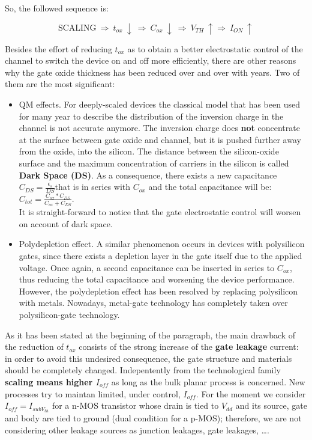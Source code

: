 \documentclass[a4paper, 12pt, twoside, openright]{report}
\begin{document}
So, the followed sequence is:

\begin{equation}
\text{SCALING} \ \Rightarrow \ t_{ox} \ \downarrow \ \Rightarrow \ C_{ox} \ \downarrow \ \Rightarrow \ V_{TH} \ \uparrow \Rightarrow \ I_{ON} \ \uparrow
\end{equation}

Besides the effort of reducing $t_{ox}$ as to obtain a better electrostatic control of the channel to switch the device on and off more efficiently, there are other reasons why the gate oxide thickness has been reduced over and over with years. Two of them are the most significant:

\begin{itemize}
\item QM effects. For deeply-scaled devices the classical model that has been used for many year to describe the distribution of the inversion charge in the channel is not accurate anymore. The inversion charge does \textbf{not} concentrate at the surface between gate oxide and channel, but it is pushed further away from the oxide, into the silicon. The distance between the silicon-oxide surface and the maximum concentration of carriers in the silicon is called \textbf{Dark Space (DS)}. As a consequence, there exists a new capacitance $C_{DS}=\frac{\epsilon_s}{DS} $that is in series with $C_{ox}$ and the total capacitance will be: \\ $C_{tot}=\frac{C_{ox}*C_{DS}}{C_{ox}+C_{DS}}$.\\ It is straight-forward to notice that the gate electrostatic control will worsen on account of dark space.
\item Polydepletion effect. A similar phenomenon occurs in devices with polysilicon gates, since there exists a depletion layer in the gate itself due to the applied voltage. Once again, a second capacitance can be inserted in series to $C_{ox}$, thus reducing the total capacitance and worsening the device performance. However, the polydepletion effect has been resolved by replacing polysilicon with metals. Nowadays, metal-gate technology has completely taken over polysilicon-gate technology.
\end{itemize} 

As it has been stated at the beginning of the paragraph, the main drawback of the reduction of $t_{ox}$ consists of the strong increase of the \textbf{gate leakage} current: in order to avoid this undesired consequence, the gate structure and materials should be completely changed. Indepentently from the technological family \textbf{scaling means higher $I_{off}$} as long as the bulk planar process is concerned. New processes try to maintan limited, under control, $I_{off}$. For the moment we consider $I_{off}=I_{subV_{th}}$ for a n-MOS transistor whose drain is tied to $V_{dd}$ and its source, gate and body are tied to ground (dual condition for a p-MOS)\label{ioff_config}; therefore, we are not considering other leakage sources as junction leakages, gate leakages, \dots.
\end{document}
